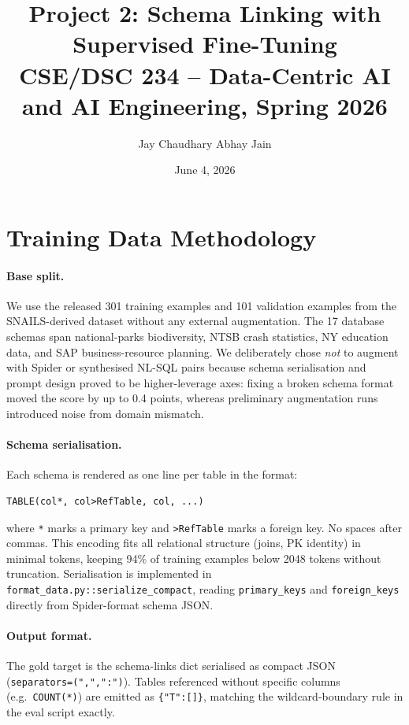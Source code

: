 \documentclass[11pt]{article}
\title{\vspace{-2em}\textbf{Project 2: Schema Linking with Supervised Fine-Tuning}\\
\large CSE/DSC 234 -- Data-Centric AI and AI Engineering, Spring 2026}
\author{Jay Chaudhary \quad\textbar\quad Abhay Jain}
\date{June 4, 2026}
\begin{document}
\maketitle
\vspace{-2.8em}

\section{Training Data Methodology}

\paragraph{Base split.}
We use the released 301 training examples and 101 validation examples from the SNAILS-derived
dataset without any external augmentation. The 17 database schemas span national-parks
biodiversity, NTSB crash statistics, NY education data, and SAP business-resource planning.
We deliberately chose \emph{not} to augment with Spider or synthesised NL-SQL pairs because
schema serialisation and prompt design proved to be higher-leverage axes: fixing a broken schema
format moved the score by up to 0.4 points, whereas preliminary augmentation runs introduced
noise from domain mismatch.

\paragraph{Schema serialisation.}
Each schema is rendered as one line per table in the format:
\begin{lstlisting}
TABLE(col*, col>RefTable, col, ...)
\end{lstlisting}
where \texttt{*} marks a primary key and \texttt{>RefTable} marks a foreign key.
No spaces after commas. This encoding fits all relational structure (joins, PK identity) in
minimal tokens, keeping 94\% of training examples below 2048 tokens without truncation.
Serialisation is implemented in \texttt{format\_data.py::serialize\_compact}, reading
\texttt{primary\_keys} and \texttt{foreign\_keys} directly from Spider-format schema JSON.

\paragraph{Output format.}
The gold target is the schema-links dict serialised as compact JSON
(\texttt{separators=(",",":")}).  Tables referenced without specific columns (e.g.\
\texttt{COUNT(*)}) are emitted as \texttt{\{"T":[]\}}, matching the wildcard-boundary rule
in the eval script exactly.
\end{document}
